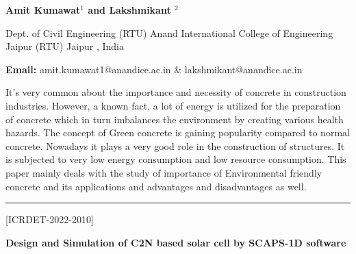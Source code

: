 \documentclass[twoside,11pt]{amsart}
\begin{document}
\centerline{\textbf{Amit Kumawat$^{1}$ and Lakshmikant
$^{2}$  }}
\vskip 5mm
\begin{flushleft}
Dept. of Civil Engineering (RTU) Anand International College of Engineering Jaipur (RTU) Jaipur , India
\vskip 5mm
\end{flushleft}
\vskip 2mm
\begin{flushleft}
{\bf Email:} amit.kumawat1@anandice.ac.in \& lakshmikant@anandice.ac.in
\end{flushleft}
\vskip 5mm
It’s very common about the importance and necessity of concrete in construction industries. However, a known fact, a lot of energy is utilized for the preparation of concrete which in turn imbalances the environment by creating various health hazards. The concept of Green concrete is gaining popularity compared to normal concrete. Nowadays it plays a very good role in the construction of structures. It is subjected to very low energy consumption and low resource consumption. This paper mainly deals with the study of importance of Environmental friendly concrete and its applications and advantages and disadvantages as well.
\vskip 2mm
\rule{\textwidth}{0.5pt}
\vskip 5mm
\begin{flushleft}
\centerline{[ICRDET-2022-2010]}
\end{flushleft}
\begin{center}\bf\LARGE
Design and Simulation of C2N based solar cell by SCAPS-1D software
\end{center}
\vskip 5mm
\end{document}

